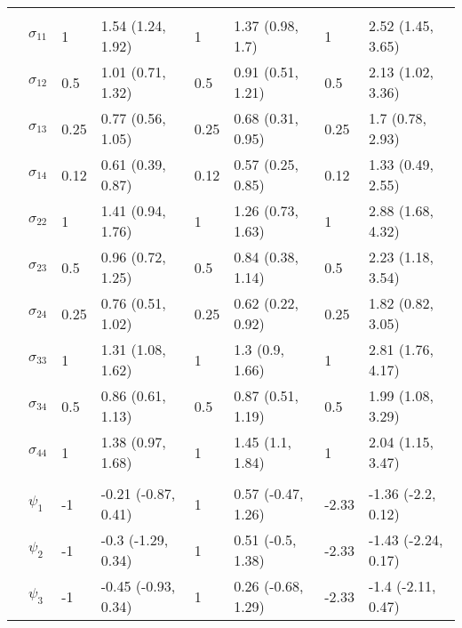 \documentclass[]{article}
\begin{document}
\begin{table}[t]
\begin{tabular}{llllllll}
\addlinespace[0.3em]
\multicolumn{8}{l}{\textbf{ }}\\
\hspace{1em} & $\sigma_{11}$ & 1 & 1.54 (1.24, 1.92) & 1 & 1.37 (0.98, 1.7) & 1 & 2.52 (1.45, 3.65)\\
\hspace{1em} & $\sigma_{12}$ & 0.5 & 1.01 (0.71, 1.32) & 0.5 & 0.91 (0.51, 1.21) & 0.5 & 2.13 (1.02, 3.36)\\
\hspace{1em} & $\sigma_{13}$ & 0.25 & 0.77 (0.56, 1.05) & 0.25 & 0.68 (0.31, 0.95) & 0.25 & 1.7 (0.78, 2.93)\\
\hspace{1em} & $\sigma_{14}$ & 0.12 & 0.61 (0.39, 0.87) & 0.12 & 0.57 (0.25, 0.85) & 0.12 & 1.33 (0.49, 2.55)\\
\hspace{1em} & $\sigma_{22}$ & 1 & 1.41 (0.94, 1.76) & 1 & 1.26 (0.73, 1.63) & 1 & 2.88 (1.68, 4.32)\\
\hspace{1em} & $\sigma_{23}$ & 0.5 & 0.96 (0.72, 1.25) & 0.5 & 0.84 (0.38, 1.14) & 0.5 & 2.23 (1.18, 3.54)\\
\hspace{1em} & $\sigma_{24}$ & 0.25 & 0.76 (0.51, 1.02) & 0.25 & 0.62 (0.22, 0.92) & 0.25 & 1.82 (0.82, 3.05)\\
\hspace{1em} & $\sigma_{33}$ & 1 & 1.31 (1.08, 1.62) & 1 & 1.3 (0.9, 1.66) & 1 & 2.81 (1.76, 4.17)\\
\hspace{1em} & $\sigma_{34}$ & 0.5 & 0.86 (0.61, 1.13) & 0.5 & 0.87 (0.51, 1.19) & 0.5 & 1.99 (1.08, 3.29)\\
\hspace{1em} & $\sigma_{44}$ & 1 & 1.38 (0.97, 1.68) & 1 & 1.45 (1.1, 1.84) & 1 & 2.04 (1.15, 3.47)\\
\addlinespace[0.3em]
\multicolumn{8}{l}{\textbf{ }}\\
\hspace{1em} & $\psi_{1}$ & -1 & -0.21 (-0.87, 0.41) & 1 & 0.57 (-0.47, 1.26) & -2.33 & -1.36 (-2.2, 0.12)\\
\hspace{1em} & $\psi_{2}$ & -1 & -0.3 (-1.29, 0.34) & 1 & 0.51 (-0.5, 1.38) & -2.33 & -1.43 (-2.24, 0.17)\\
\hspace{1em} & $\psi_{3}$ & -1 & -0.45 (-0.93, 0.34) & 1 & 0.26 (-0.68, 1.29) & -2.33 & -1.4 (-2.11, 0.47)\\

\end{tabular}
\end{table}
\end{document}
